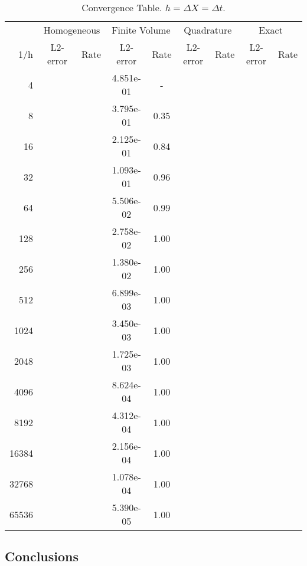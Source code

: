 \documentclass{article}
\begin{document}
\begin{table}
\caption{Convergence Table. $h=\Delta X = \Delta t$.}
\label{tab:ct}
\centering
\begin{tabular}{rcccccccc}    
 & \multicolumn{2}{c}{Homogeneous} & \multicolumn{2}{c}{Finite Volume} & \multicolumn{2}{c}{Quadrature} & \multicolumn{2}{c}{Exact} \\
1/h & L2-error & Rate & L2-error & Rate & L2-error & Rate & L2-error & Rate  \\
4 	  & & & 4.851e-01 & -    & \\
8 	  & & & 3.795e-01 & 0.35 & \\
16 	  & & & 2.125e-01 & 0.84 & \\
32 	  & & & 1.093e-01 & 0.96 & \\
64 	  & & & 5.506e-02 & 0.99 & \\
128   & & & 2.758e-02 & 1.00 & \\
256   & & & 1.380e-02 & 1.00 & \\
512   & & & 6.899e-03 & 1.00 & \\
1024  & & & 3.450e-03 & 1.00 & \\
2048  & & & 1.725e-03 & 1.00 & \\
4096  & & & 8.624e-04 & 1.00 & \\
8192  & & & 4.312e-04 & 1.00 & \\ 
16384 &	& & 2.156e-04 & 1.00 & \\
32768 & & & 1.078e-04 & 1.00 & \\
65536 & & & 5.390e-05 & 1.00 & \\
\end{tabular}
\end{table}

\subsection{Conclusions}



\end{document}
